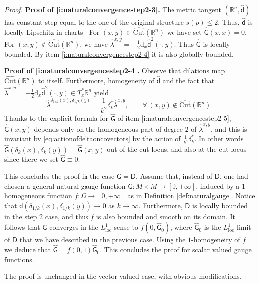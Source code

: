\documentclass[11pt,a4paper]{article}
\theoremstyle{plain}
\theoremstyle{definition}
\theoremstyle{remark}
\numberwithin{equation}{section}
\newcommand{\R}{\mathbb{R}} %
\newcommand{\Cut}{\mathrm{Cut}}
\newcommand{\loc}{\mathrm{loc}}
\newcommand{\di}{\mathrm{d}}
\newcommand{\sfd}{\mathsf d}
\newcommand{\sfD}{\mathsf D}
\newcommand{\sfG}{\mathsf G}
\begin{document}
\begin{proof}
\textbf{Proof of \ref{i:naturalconvergencestep2-3}.} The metric tangent $(\R^n,\hat{\sfd})$ has constant step equal to the one of the original structure $s(p) \leq 2$. Thus, $\hat{\sfd}$ is locally Lipschitz in charts \cite[Cor.\@ 6.2]{AAPL-transport}. For $(x,y) \in \widehat{\Cut}(\R^n)$ we have set $\hat{\sfG}(x,x)=0$. For $(x,y)\notin \widehat{\Cut}(\R^n)$, we have $\hat{\lambda}^{x,y} = - \tfrac{1}{2} \di_x \hat{\sfd}^2(\cdot,y)$. Thus $\hat{\sfG}$ is locally bounded. By item \ref{i:naturalconvergencestep2-4} it is also globally bounded.

\textbf{Proof of \ref{i:naturalconvergencestep2-4}.} Observe that dilations map $\widehat{\Cut}(\R^n)$ to itself. Furthermore, homogeneity of $\hat{\sfd}$ and the fact that $\hat{\lambda}^{x,y} = -\tfrac{1}{2} \di_x \hat{\sfd}^2(\cdot,y) \in T_x^*\R^n$ yield
\begin{equation}
\hat{\lambda}^{\delta_{1/k}(x),\delta_{1/k}(y)} = \frac{1}{k^2}\delta_{k}^* \hat{\lambda}^{x,y},\qquad \forall\, (x,y)\notin \widehat{\Cut}(\R^n).
\end{equation}
Thanks to the explicit formula for $\hat{\sfG}$ of item \ref{i:naturalconvergencestep2-5}, $\hat{\sfG}(x,y)$ depends only on the homogeneous part of degree $2$ of $\hat{\lambda}^{x,y}$, and this is invariant by \eqref{eq:actionofdeltaoncovectors} by the action of $\frac{1}{k^2}\delta_{k}^*$. In other words $\hat{\sfG}(\delta_k(x),\delta_{k}(y)) = \hat{\sfG}(x,y)$ out of the cut locus, and also at the cut locus since there we set $\hat{\sfG}\equiv 0$.

This concludes the proof in the case $\sfG = \sfD$. Assume that, instead of $\sfD$, one had chosen a general natural gauge function $\sfG: M \times M \to [0,+\infty]$, induced by a $1$-homogeneous function $f: \Omega \to [0,+\infty]$ as in Definition \ref{def:naturalgauge}. Notice that $\sfd(\delta_{1/k}(x),\delta_{1/k}(y)) \to 0$ as $k\to \infty$. Furthermore, $\sfD$ is locally bounded in the step $2$ case, and thus $f$ is also bounded and smooth on its domain. It follows that $\sfG$ converges in the $L^1_{\loc}$ sense to $f(0,\hat{\sfG}_0)$, where $\hat{\sfG}_0$ is the $L^1_{\loc}$ limit of $\sfD$ that we have described in the previous case. Using the $1$-homogeneity of $f$ we deduce that $\hat{\sfG}=f(0,1)\hat{\sfG}_0$. This concludes the proof for scalar valued gauge functions.

The proof is unchanged in the vector-valued case, with obvious modifications.
\end{proof}
\end{document}
